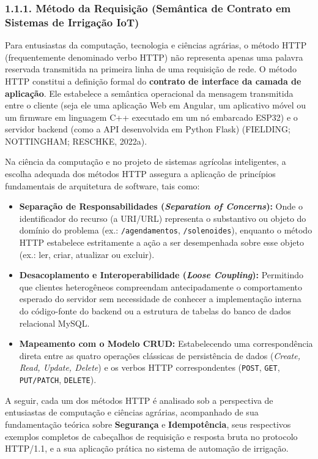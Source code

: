 \subsubsection*{1.1.1. Método da Requisição (Semântica de Contrato em Sistemas de Irrigação IoT)}

Para entusiastas da computação, tecnologia e ciências agrárias, o método HTTP (frequentemente denominado verbo HTTP) não representa apenas uma palavra reservada transmitida na primeira linha de uma requisição de rede. O método HTTP constitui a definição formal do \textbf{contrato de interface da camada de aplicação}. Ele estabelece a semântica operacional da mensagem transmitida entre o cliente (seja ele uma aplicação Web em Angular, um aplicativo móvel ou um firmware em linguagem C++ executado em um nó embarcado ESP32) e o servidor backend (como a API desenvolvida em Python Flask) (FIELDING; NOTTINGHAM; RESCHKE, 2022a).

Na ciência da computação e no projeto de sistemas agrícolas inteligentes, a escolha adequada dos métodos HTTP assegura a aplicação de princípios fundamentais de arquitetura de software, tais como:
\begin{itemize}
    \item \textbf{Separação de Responsabilidades (\textit{Separation of Concerns}):} Onde o identificador do recurso (a URI/URL) representa o substantivo ou objeto do domínio do problema (ex.: \texttt{/agendamentos}, \texttt{/solenoides}), enquanto o método HTTP estabelece estritamente a ação a ser desempenhada sobre esse objeto (ex.: ler, criar, atualizar ou excluir).
    \item \textbf{Desacoplamento e Interoperabilidade (\textit{Loose Coupling}):} Permitindo que clientes heterogêneos compreendam antecipadamente o comportamento esperado do servidor sem necessidade de conhecer a implementação interna do código-fonte do backend ou a estrutura de tabelas do banco de dados relacional MySQL.
    \item \textbf{Mapeamento com o Modelo CRUD:} Estabelecendo uma correspondência direta entre as quatro operações clássicas de persistência de dados (\textit{Create, Read, Update, Delete}) e os verbos HTTP correspondentes (\texttt{POST}, \texttt{GET}, \texttt{PUT/PATCH}, \texttt{DELETE}).
\end{itemize}

A seguir, cada um dos métodos HTTP é analisado sob a perspectiva de entusiastas de computação e ciências agrárias, acompanhado de sua fundamentação teórica sobre \textbf{Segurança} e \textbf{Idempotência}, seus respectivos exemplos completos de cabeçalhos de requisição e resposta bruta no protocolo HTTP/1.1, e a sua aplicação prática no sistema de automação de irrigação.

